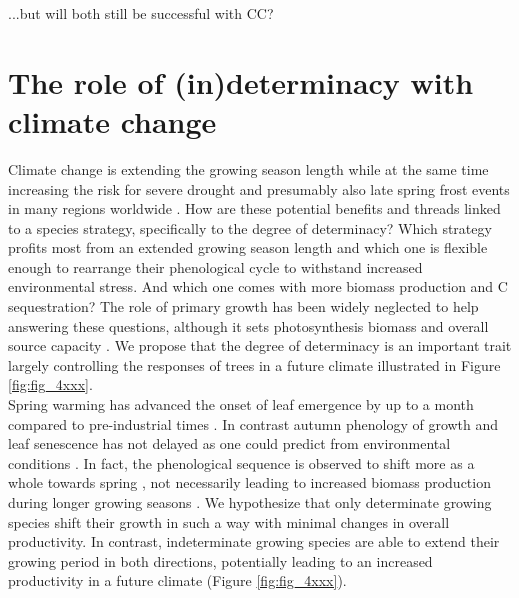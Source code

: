 \documentclass{article}
\begin{document}
	...but will both still be successful with CC?
	
\section*{The role of (in)determinacy with climate change}
Climate change is extending the growing season length while at the same time increasing the risk for severe drought \citep{haoChangesSeverityCompound2018} and presumably also late spring frost events in many regions worldwide \citep{zohnerLatespringFrostRisk2020}. How are these potential benefits and threads linked to a species strategy, specifically to the degree of determinacy? Which strategy profits most from an extended growing season length and which one is flexible enough to rearrange their phenological cycle to withstand increased environmental stress. And which one comes with more biomass production and C sequestration? The role of primary growth has been widely neglected to help answering these questions, although it sets photosynthesis biomass and overall source capacity \citep{girardPolycyclismFundamentalTree2011}. We propose that the degree of determinacy is an important trait largely controlling the responses of trees in a future climate illustrated in Figure \ref{fig:fig_4xxx}. \\

Spring warming has advanced the onset of leaf emergence by up to a month compared to pre-industrial times \citep{vitasseGreatAccelerationPlant2022b}. In contrast autumn phenology of growth and leaf senescence has not delayed as one could predict from environmental conditions \citep{zaniIncreasedGrowingseasonProductivity2020b, zohnerEffectClimateWarming2023}. In fact, the phenological sequence is observed to shift more as a whole towards spring \citep{keenanTimingAutumnSenescence2015b}, not necessarily leading to increased biomass production during longer growing seasons \citep{zaniIncreasedGrowingseasonProductivity2020b}. We hypothesize that only determinate growing species shift their growth in such a way with minimal changes in overall productivity. In contrast, indeterminate growing species are able to extend their growing period in both directions, potentially leading to an increased productivity in a future climate (Figure \ref{fig:fig_4xxx}). \\
\end{document}
